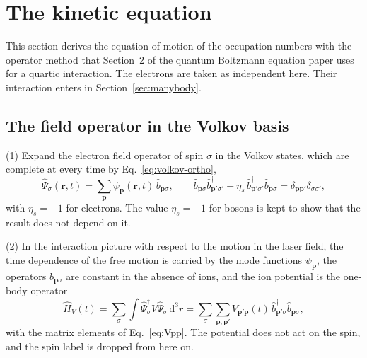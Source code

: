 \documentclass[11pt]{article}
\numberwithin{equation}{section}
\newcommand{\pv}{\mathbf p}
\newcommand{\rv}{\mathbf r}
\newcommand{\dd}{\mathrm d}
\begin{document}
\section{The kinetic equation}
\label{sec:kinetic}
This section derives the equation of motion of the occupation numbers with
the operator method that Section~2 of the quantum Boltzmann equation paper
\cite{Watson2026} uses for a quartic interaction. The electrons are taken as
independent here. Their interaction enters in Section~\ref{sec:manybody}.

\subsection{The field operator in the Volkov basis}
{\noindent}(1) Expand the electron field operator of spin $\sigma$ in the
Volkov states, which are complete at every time by
Eq.~\eqref{eq:volkov-ortho},
\begin{equation}
\hat\Psi_\sigma(\rv,t)=\sum_{\pv}\psi_{\pv}(\rv,t)\,\hat b_{\pv\sigma},\qquad
\hat b_{\pv\sigma}\hat b^\dagger_{\pv'\sigma'}-\eta_s\,\hat b^\dagger_{\pv'\sigma'}\hat b_{\pv\sigma}
=\delta_{\pv\pv'}\delta_{\sigma\sigma'},
\end{equation}
with $\eta_s=-1$ for electrons. The value $\eta_s=+1$ for bosons is kept to
show that the result does not depend on it.

{\noindent}(2) In the interaction picture with respect to the motion in the
laser field, the time dependence of the free motion is carried by the mode
functions $\psi_{\pv}$, the operators $\hat b_{\pv\sigma}$ are constant in
the absence of ions, and the ion potential is the one-body operator
\begin{equation}
\hat H_V(t)=\sum_\sigma\int\hat\Psi^\dagger_\sigma V\hat\Psi_\sigma\,\dd^3r
=\sum_\sigma\sum_{\pv,\pv'}V_{\pv'\pv}(t)\,\hat b^\dagger_{\pv'\sigma}\hat b_{\pv\sigma},
\label{eq:HV}
\end{equation}
with the matrix elements of Eq.~\eqref{eq:Vpp}. The potential does not act
on the spin, and the spin label is dropped from here on.
\end{document}
